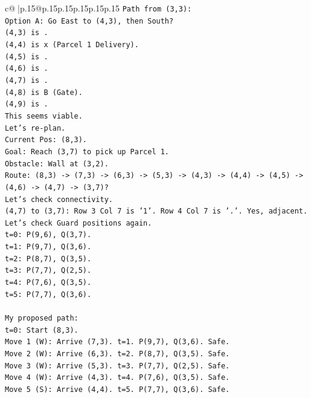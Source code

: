 \documentclass{article}
\begin{document}
{\begin{supertabular}{c@{$\;$}|p{.15\linewidth}@{}p{.15\linewidth}p{.15\linewidth}p{.15\linewidth}p{.15\linewidth}p{.15\linewidth}}
{{{\texttt{Path from (3,3):} \\
\texttt{Option A: Go East to (4,3), then South?} \\
\texttt{(4,3) is .} \\
\texttt{(4,4) is x (Parcel 1 Delivery).} \\
\texttt{(4,5) is .} \\
\texttt{(4,6) is .} \\
\texttt{(4,7) is .} \\
\texttt{(4,8) is B (Gate).} \\
\texttt{(4,9) is .} \\
\texttt{This seems viable.} \\
\texttt{Let's re{-}plan.} \\
\texttt{Current Pos: (8,3).} \\
\texttt{Goal: Reach (3,7) to pick up Parcel 1.} \\
\texttt{Obstacle: Wall at (3,2).} \\
\texttt{Route: (8,3) {-}> (7,3) {-}> (6,3) {-}> (5,3) {-}> (4,3) {-}> (4,4) {-}> (4,5) {-}> (4,6) {-}> (4,7) {-}> (3,7)?} \\
\texttt{Let's check connectivity.} \\
\texttt{(4,7) to (3,7): Row 3 Col 7 is '1'. Row 4 Col 7 is '.'. Yes, adjacent.} \\
\texttt{Let's check Guard positions again.} \\
\texttt{t=0: P(9,6), Q(3,7).} \\
\texttt{t=1: P(9,7), Q(3,6).} \\
\texttt{t=2: P(8,7), Q(3,5).} \\
\texttt{t=3: P(7,7), Q(2,5).} \\
\texttt{t=4: P(7,6), Q(3,5).} \\
\texttt{t=5: P(7,7), Q(3,6).} \\
\\ 
\texttt{My proposed path:} \\
\texttt{t=0: Start (8,3).} \\
\texttt{Move 1 (W): Arrive (7,3). t=1. P(9,7), Q(3,6). Safe.} \\
\texttt{Move 2 (W): Arrive (6,3). t=2. P(8,7), Q(3,5). Safe.} \\
\texttt{Move 3 (W): Arrive (5,3). t=3. P(7,7), Q(2,5). Safe.} \\
\texttt{Move 4 (W): Arrive (4,3). t=4. P(7,6), Q(3,5). Safe.} \\
\texttt{Move 5 (S): Arrive (4,4). t=5. P(7,7), Q(3,6). Safe.} \\
}}}
\end{supertabular}}
\end{document}
